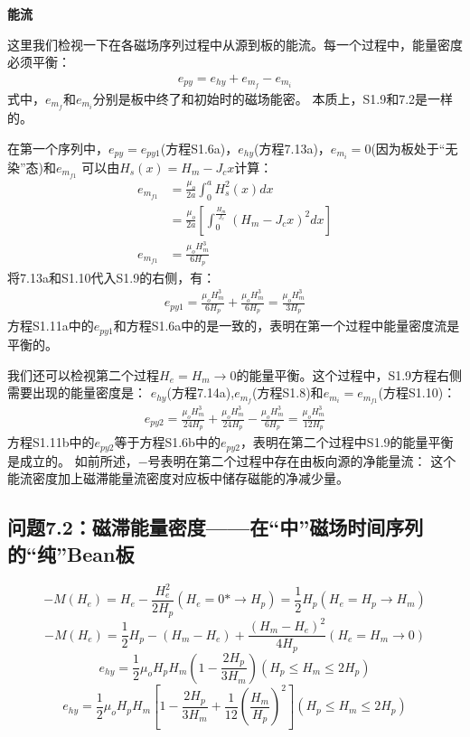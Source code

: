 \textbf{能流}

这里我们检视一下在各磁场序列过程中从源到板的能流。每一个过程中，能量密度必须平衡：
\begin{align*}%
e_{py}=e_{hy}+e_{m_f}-e_{m_i} \tag{S1.9}
\end{align*}
式中，$e_{m_f}$和$e_{m_i}$分别是板中终了和初始时的磁场能密。
本质上，S1.9和7.2是一样的。

在第一个序列中，$e_{py}=e_{py1}$(方程S1.6a)，$e_{hy}$(方程7.13a)，$e_{m_i}=0$(因为板处于“无染”态)和$e_{m_{f1}}$
可以由$H_s(x)=H_m-J_c x$计算：
\begin{align*}%
e_{m_{f1}}&=\frac{\mu_o}{2a}\int_{0}^{a}H_{s}^{2}(x)dx \\
&=\frac{\mu_o}{2a}\left[\int_{0}^{\frac{H_m}{J_c}}(H_m-J_cx)^2dx\right]\\
e_{m_{f1}}&=\frac{\mu_oH_{m}^{3}}{6H_p} \tag{S1.10}
\end{align*}
将7.13a和S1.10代入S1.9的右侧，有：
\begin{align*}%
e_{py1}=\frac{\mu_oH_{m}^{3}}{6H_p}+\frac{\mu_oH_{m}^{3}}{6H_p}=\frac{\mu_oH_{m}^{3}}{3H_p} \tag{S1.11a}
\end{align*}
方程S1.11a中的$e_{py1}$和方程S1.6a中的是一致的，表明在第一个过程中能量密度流是平衡的。

我们还可以检视第二个过程$H_e=H_m\rightarrow 0$的能量平衡。这个过程中，S1.9方程右侧需要出现的能量密度是：
$e_{hy}$(方程7.14a),$e_{m_f}$(方程S1.8)和$e_{m_i}=e_{m_{f1}}$(方程S1.10)：
\begin{align*}%
e_{py2}=\frac{\mu_oH_{m}^{3}}{24H_p}+\frac{\mu_oH_{m}^{3}}{24H_p}-\frac{\mu_oH_{m}^{3}}{6H_p}=\frac{\mu_oH_{m}^{3}}{12H_p} \tag{S1.11b}
\end{align*}
方程S1.11b中的$e_{py2}$等于方程S1.6b中的$e_{py2}$，表明在第二个过程中S1.9的能量平衡是成立的。
如前所述，$-$号表明在第二个过程中存在由板向源的净能量流：
这个能流密度加上磁滞能量流密度对应板中储存磁能的净减少量。


\subsection{问题7.2：磁滞能量密度——在“中”磁场时间序列的“纯”Bean板}


\begin{equation}%
-M(H_e)=H_e-\frac{H_{e}^{2}}{2H_p}                          (H_e=0*\rightarrow H_p)
=\frac{1}{2}H_p                                      (H_e=H_p\rightarrow H_m)
\end{equation}
\begin{equation}%
-M(H_e)=\frac{1}{2}H_p-(H_m-H_e)+\frac{(H_m-H_e)^2}{4H_p}   (H_e=H_m\rightarrow 0)
\end{equation}
\begin{equation}%
e_{hy}=\frac{1}{2}\mu_oH_pH_m\left(1-\frac{2H_p}{3H_m}\right)   (H_p\leq H_m\leq 2H_p)
\end{equation}
\begin{equation}%
e_{hy}=\frac{1}{2}\mu_oH_pH_m\left[1-\frac{2H_p}{3H_m}+\frac{1}{12}\left(\frac{H_m}{H_p}\right)^2\right]     (H_p\leq H_m \leq 2H_p)
\end{equation}

